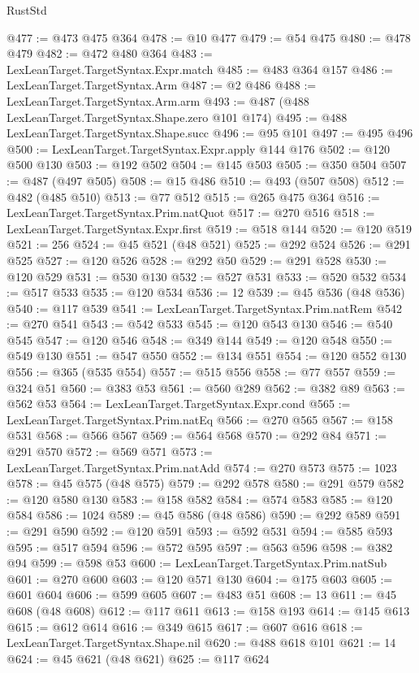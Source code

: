 \begin{lexlean}{RustStd}
\begin{coremodule}
{\begin{coremodule}
{{{{{{{{{{{{{{{{{{{{{{{{{{{{{{{{{{{{{{{{{{{{{{{{{{{{{{{{{{{{@477 := @473 @475 @364
@478 := @10 @477
@479 := @54 @475
@480 := @478 @479
@482 := @472 @480 @364
@483 := LexLeanTarget.TargetSyntax.Expr.match
@485 := @483 @364 @157
@486 := LexLeanTarget.TargetSyntax.Arm
@487 := @2 @486
@488 := LexLeanTarget.TargetSyntax.Arm.arm
@493 := @487 (@488 LexLeanTarget.TargetSyntax.Shape.zero @101 @174)
@495 := @488 LexLeanTarget.TargetSyntax.Shape.succ
@496 := @95 @101
@497 := @495 @496
@500 := LexLeanTarget.TargetSyntax.Expr.apply @144 @176
@502 := @120 @500 @130
@503 := @192 @502
@504 := @145 @503
@505 := @350 @504
@507 := @487 (@497 @505)
@508 := @15 @486
@510 := @493 (@507 @508)
@512 := @482 (@485 @510)
@513 := @77 @512
@515 := @265 @475 @364
@516 := LexLeanTarget.TargetSyntax.Prim.natQuot
@517 := @270 @516
@518 := LexLeanTarget.TargetSyntax.Expr.first
@519 := @518 @144
@520 := @120 @519
@521 := 256
@524 := @45 @521 (@48 @521)
@525 := @292 @524
@526 := @291 @525
@527 := @120 @526
@528 := @292 @50
@529 := @291 @528
@530 := @120 @529
@531 := @530 @130
@532 := @527 @531
@533 := @520 @532
@534 := @517 @533
@535 := @120 @534
@536 := 12
@539 := @45 @536 (@48 @536)
@540 := @117 @539
@541 := LexLeanTarget.TargetSyntax.Prim.natRem
@542 := @270 @541
@543 := @542 @533
@545 := @120 @543 @130
@546 := @540 @545
@547 := @120 @546
@548 := @349 @144
@549 := @120 @548
@550 := @549 @130
@551 := @547 @550
@552 := @134 @551
@554 := @120 @552 @130
@556 := @365 (@535 @554)
@557 := @515 @556
@558 := @77 @557
@559 := @324 @51
@560 := @383 @53
@561 := @560 @289
@562 := @382 @89
@563 := @562 @53
@564 := LexLeanTarget.TargetSyntax.Expr.cond
@565 := LexLeanTarget.TargetSyntax.Prim.natEq
@566 := @270 @565
@567 := @158 @531
@568 := @566 @567
@569 := @564 @568
@570 := @292 @84
@571 := @291 @570
@572 := @569 @571
@573 := LexLeanTarget.TargetSyntax.Prim.natAdd
@574 := @270 @573
@575 := 1023
@578 := @45 @575 (@48 @575)
@579 := @292 @578
@580 := @291 @579
@582 := @120 @580 @130
@583 := @158 @582
@584 := @574 @583
@585 := @120 @584
@586 := 1024
@589 := @45 @586 (@48 @586)
@590 := @292 @589
@591 := @291 @590
@592 := @120 @591
@593 := @592 @531
@594 := @585 @593
@595 := @517 @594
@596 := @572 @595
@597 := @563 @596
@598 := @382 @94
@599 := @598 @53
@600 := LexLeanTarget.TargetSyntax.Prim.natSub
@601 := @270 @600
@603 := @120 @571 @130
@604 := @175 @603
@605 := @601 @604
@606 := @599 @605
@607 := @483 @51
@608 := 13
@611 := @45 @608 (@48 @608)
@612 := @117 @611
@613 := @158 @193
@614 := @145 @613
@615 := @612 @614
@616 := @349 @615
@617 := @607 @616
@618 := LexLeanTarget.TargetSyntax.Shape.nil
@620 := @488 @618 @101
@621 := 14
@624 := @45 @621 (@48 @621)
@625 := @117 @624
}}}}}}}}}}}}}}}}}}}}}}}}}}}}}}}}}}}}}}}}}}}}}}}}}}}}}}}}}}}}
\end{coremodule}}
\end{coremodule}
\end{lexlean}
